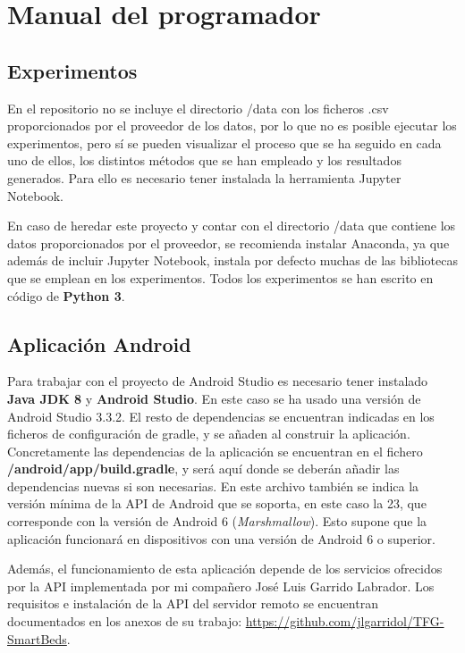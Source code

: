 \section{Manual del programador}

\subsection{Experimentos} 

En el repositorio no se incluye el directorio /data con los ficheros .csv proporcionados por el proveedor de los datos, por lo que no es posible ejecutar los experimentos, pero sí se pueden visualizar el proceso que se ha seguido en cada uno de ellos, los distintos métodos que se han empleado y los resultados generados. Para ello es necesario tener instalada la herramienta Jupyter Notebook. 

En caso de heredar este proyecto y contar con el directorio /data que contiene los datos proporcionados por el proveedor, se recomienda instalar Anaconda, ya que además de incluir Jupyter Notebook, instala por defecto muchas de las bibliotecas que se emplean en los experimentos. Todos los experimentos se han escrito en código de \textbf{Python 3}. 

\subsection{Aplicación Android}

Para trabajar con el proyecto de Android Studio es necesario tener instalado \textbf{Java JDK 8} y \textbf{Android Studio}. En este caso se ha usado una versión de Android Studio 3.3.2. El resto de dependencias se encuentran indicadas en los ficheros de configuración de gradle, y se añaden al construir la aplicación. Concretamente las dependencias de la aplicación se encuentran en el fichero \textbf{/android/app/build.gradle}, y será aquí donde se deberán añadir las dependencias nuevas si son necesarias. En este archivo también se indica la versión mínima de la API de Android que se soporta, en este caso la 23, que corresponde con la versión de Android 6 (\textit{Marshmallow}). Esto supone que la aplicación funcionará en dispositivos con una versión de Android 6 o superior. 

Además, el funcionamiento de esta aplicación depende de los servicios ofrecidos por la API implementada por mi compañero José Luis Garrido Labrador. Los requisitos e instalación de la API del servidor remoto se encuentran documentados en los anexos de su trabajo: \url{https://github.com/jlgarridol/TFG-SmartBeds}.

